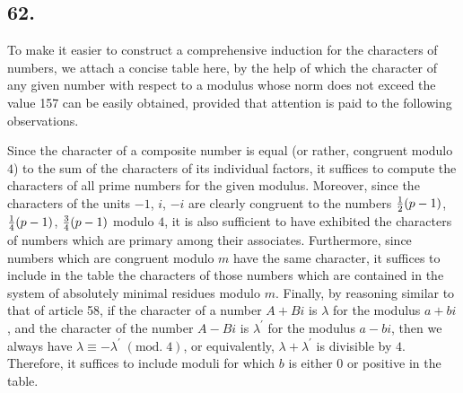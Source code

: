 \documentclass[twoside,12pt]{memoir}
\renewcommand{\pmod}[1]{\;(\textrm{mod.}\;#1)}
\let\oldfrac\frac
\def\frac#1#2{\mathchoice{\tfrac{#1}{#2}}{\oldfrac{#1}{#2}}{\genfrac{}{}{}{2}{#1}{#2\mathstrut}}{\genfrac{}{}{}{3}{#1}{#2\mathstrut}}}
\begin{document}
\subsection*{62.}
 
To make it easier to construct a comprehensive induction for the characters of numbers, we attach a concise table here, by the help of which the character of any given number with respect to a modulus whose norm does not exceed the value 157 can be easily obtained, provided that attention is paid to the following observations.
 
Since the character of a composite number is equal (or rather, congruent modulo \(4\)) to the sum of the characters of its individual factors, it suffices to compute the characters of all prime numbers for the given modulus. Moreover, since the characters of the units \(-1\), \(i\), \(-i\) are clearly congruent to the numbers \(\frac{1}{2}(p-1)\), \(\frac{1}{4}(p-1)\), \(\frac{3}{4}(p-1)\) modulo \(4\), it is also sufficient to have exhibited the characters of numbers which are primary among their associates. Furthermore, since numbers which are congruent modulo \(m\) have the same character, it suffices to include in the table the characters of those numbers which are contained in the system of absolutely minimal residues modulo \(m\). Finally, by reasoning similar to that of article 58, if the character of a number \(A+B i\) is \(\lambda\) for the modulus \(a+b i\), and the character of the number \(A-B i\) is \(\lambda^{\prime}\) for the modulus \(a-b i\), then we always have \(\lambda \equiv-\lambda^{\prime}\pmod{4}\), or equivalently, \(\lambda+\lambda^{\prime}\) is divisible by \(4\). Therefore, it suffices to include moduli for which \(b\) is either \(0\) or positive in the table.
%
\end{document}
